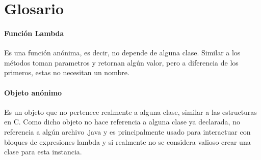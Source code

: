 \documentclass[a4paper]{article}
\begin{document}
    \section{Glosario}

    \paragraph{Funci\'on Lambda}
    Es una funci\'on an\'onima, es decir, no depende de alguna clase.
    Similar a los m\'etodos toman parametros y retornan alg\'un valor, pero a diferencia de los primeros, estas no necesitan un nombre.
    \paragraph{Objeto an\'onimo}
    Es un objeto que no pertenece realmente a alguna clase, similar a las estructuras en C.
    Como dicho objeto no hace referencia a alguna clase ya declarada, no referencia a alg\'un archivo .java y es principalmente usado para interactuar con bloques de expresiones lambda y si realmente no se considera valioso crear una clase para esta instancia.

\end{document}
